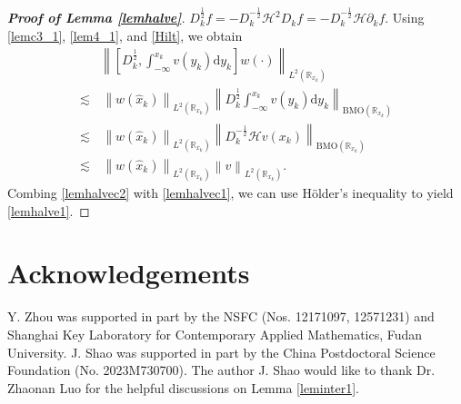 \documentclass[10pt,twoside,a4paper]{article}
\numberwithin{equation}{section}\allowdisplaybreaks
\begin{document}
\begin{appendices}
\begin{proof} [\textbf{Proof of Lemma \ref{lemhalve}}]
		$ D_k^{\frac12} f=- D_k^{-\frac 12}\mathcal{H}^2D_k f=- D_k^{-\frac 12} \mathcal{H} \partial_k f$. Using \eqref{lemc3_1}, \eqref{lem4_1}, and \eqref{Hilt}, we obtain
		\begin{align} \label{lemhalvec2}
			&  \left\|\left[D_k^{\frac 12},\int_{-\infty}^{x_k} v(y_k) \mathrm{d} y_k \right]w(\cdot) \right\|_{L^2(\mathbb{R}_{x_k})}\nonumber\\
			\lesssim &\, \left\|w(\hat{x}_k)\right\|_{L^2(\mathbb{R}_{x_k})}  \left\|D_k^{\frac 12}\int_{-\infty}^{x_k} v(y_k) \mathrm{d} y_k  \right\|_{\mathrm{BMO}(\mathbb{R}_{x_k})}\nonumber\\
			\lesssim &\,\left\|w(\hat{x}_k) \right\|_{L^2(\mathbb{R}_{x_k})}  \left\|D_k^{-\frac 12} \mathcal{H}v(x_k) \right\|_{\mathrm{BMO}(\mathbb{R}_{x_k})}\\
			\lesssim &\,\left\|w(\hat{x}_k) \right\|_{L^2(\mathbb{R}_{x_k})}  \left\| v \right\|_{L^2(\mathbb{R}_{x_k})}. \nonumber
		\end{align}
		Combing \eqref{lemhalvec2} with \eqref{lemhalvec1}, we can use H\"older's inequality to yield  \eqref{lemhalve1}.	
	\end{proof}
		
		
		
		
	\end{appendices}

\section*{Acknowledgements}
Y. Zhou was supported in part by the NSFC
(Nos. 12171097, 12571231) and Shanghai Key Laboratory for Contemporary Applied Mathematics, Fudan University.
 J. Shao  was supported in part by the China Postdoctoral Science Foundation (No. 2023M730700).
The author J. Shao would like to  thank   Dr. Zhaonan Luo for the helpful discussions on Lemma  \ref{leminter1}. 
	
\end{document}

